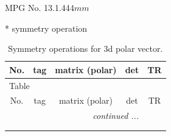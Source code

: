 \documentclass[fleqn,8pt]{jsarticle}
\begin{document}
\setcounter{MaxMatrixCols}{32}

\renewcommand{\tablename}{Table~}
\renewcommand{\figurename}{Figure~}
\begin{center}
\LARGE
MPG No. 13.1.44\quad$4mm$
\end{center}
* symmetry operation
\renewcommand{\arraystretch}{1.3}
\begin{longtable}{ccccc}
\caption{Symmetry operations for 3d polar vector.}
 \\
 \hline \hline
No. & tag & matrix (polar) & det & TR \\ \hline \endfirsthead

\multicolumn{4}{l}{\tablename\ \thetable{}} \\
 \hline \hline
No. & tag & matrix (polar) & det & TR \\ \hline \endhead

 \hline \hline
\multicolumn{4}{r}{\footnotesize\it continued ...} \\ \endfoot

 \hline \hline
\multicolumn{4}{r}{} \\ \endlastfoot


\end{longtable}
\end{document}
